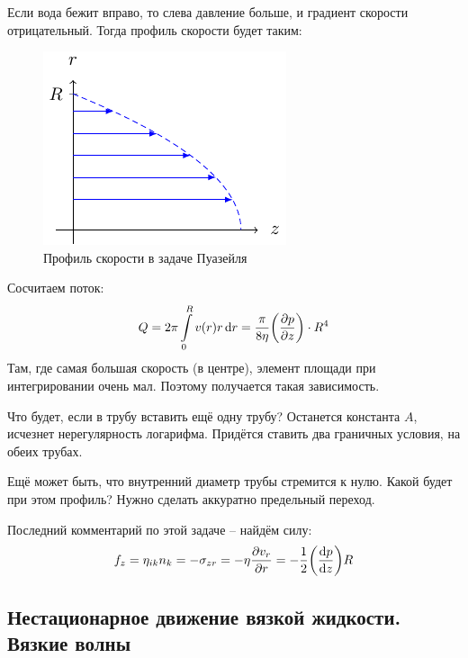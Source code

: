 Если вода бежит вправо, то слева давление больше, и градиент скорости отрицательный. Тогда профиль скорости будет таким:

\begin{figure}[h!]
    \centering
    \includegraphics[scale=1.5]{img/puaz_prof}
    \caption{Профиль скорости в задаче Пуазейля}
    \label{fig:figure1}
\end{figure}

Сосчитаем поток:
\begin{equation}
    Q=2\pi \int\limits_0^R v(r) r \dd{r} =
    \frac{\pi}{8\eta} \qty(\pdv{p}{z})\cdot R^4
\end{equation}
Там, где самая большая скорость (в центре), элемент площади при интегрировании очень мал. Поэтому получается такая зависимость.

Что будет, если в трубу вставить ещё одну трубу? Останется константа $A$, исчезнет нерегулярность логарифма. Придётся ставить два граничных условия, на обеих трубах.

Ещё может быть, что внутренний диаметр трубы стремится к нулю. Какой будет при этом профиль? Нужно сделать аккуратно предельный переход.

Последний комментарий по этой задаче -- найдём силу:
\begin{equation}
    f_z = \eta_{ik} n_k = -\sigma_{zr} = -\eta \pdv{v_r}{r}=
    -\frac{1}{2} \qty(\dv{p}{z})R
\end{equation}

\newpage
\subsection{Нестационарное движение вязкой жидкости. Вязкие волны}

